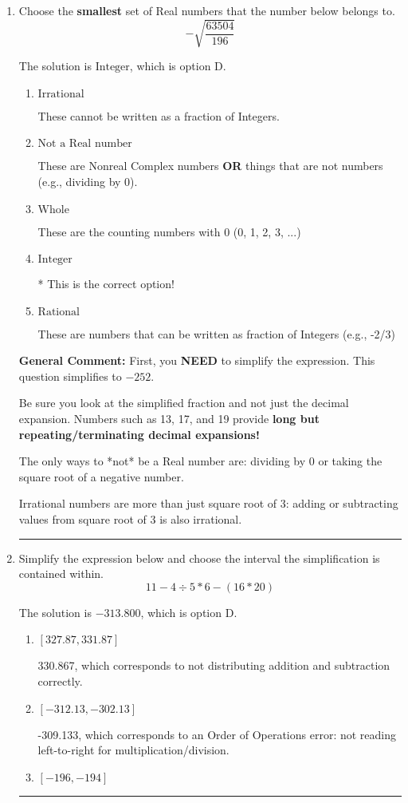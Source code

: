 \documentclass{extbook}[14pt]
\newcommand{\litem}[1]{\item #1

\rule{\textwidth}{0.4pt}}
\begin{document}
\begin{enumerate}\litem{
Choose the \textbf{smallest} set of Real numbers that the number below belongs to.
\[ -\sqrt{\frac{63504}{196}} \]

The solution is \( \text{Integer} \), which is option D.\begin{enumerate}[label=\Alph*.]
\item \( \text{Irrational} \)

These cannot be written as a fraction of Integers.
\item \( \text{Not a Real number} \)

These are Nonreal Complex numbers \textbf{OR} things that are not numbers (e.g., dividing by 0).
\item \( \text{Whole} \)

These are the counting numbers with 0 (0, 1, 2, 3, ...)
\item \( \text{Integer} \)

* This is the correct option!
\item \( \text{Rational} \)

These are numbers that can be written as fraction of Integers (e.g., -2/3)
\end{enumerate}

\textbf{General Comment:} First, you \textbf{NEED} to simplify the expression. This question simplifies to $-252$. 
 
 Be sure you look at the simplified fraction and not just the decimal expansion. Numbers such as 13, 17, and 19 provide \textbf{long but repeating/terminating decimal expansions!} 
 
 The only ways to *not* be a Real number are: dividing by 0 or taking the square root of a negative number. 
 
 Irrational numbers are more than just square root of 3: adding or subtracting values from square root of 3 is also irrational.
}
\litem{
Simplify the expression below and choose the interval the simplification is contained within.
\[ 11 - 4 \div 5 * 6 - (16 * 20) \]

The solution is \( -313.800 \), which is option D.\begin{enumerate}[label=\Alph*.]
\item \( [327.87, 331.87] \)

 330.867, which corresponds to not distributing addition and subtraction correctly.
\item \( [-312.13, -302.13] \)

 -309.133, which corresponds to an Order of Operations error: not reading left-to-right for multiplication/division.
\item \( [-196, -194] \)


\end{enumerate}}
\end{enumerate}
\end{document}
